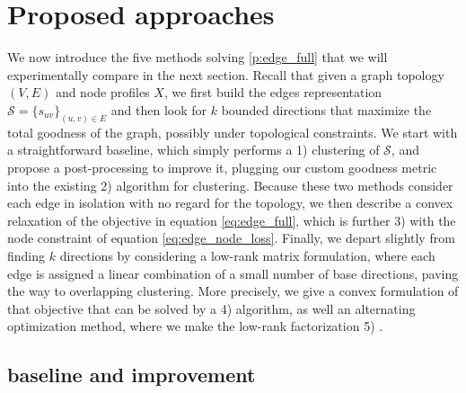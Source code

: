 

\section{Proposed approaches}
\label{sec:edge_methods}

We now introduce the five methods solving \autoref{p:edge_full} that we will experimentally compare
in the next section. Recall that given a graph topology $(V, E)$ and node profiles $X$, we first
build the edges representation $\mathcal{S} = \{s_{uv}\}_{(u,v) \in E}$ and then look for $k$
bounded directions that maximize the total goodness of the graph, possibly under topological
constraints. We start with a straightforward baseline, which simply performs a \newline
\hspace*{14pt} 1) \kmeans{} clustering of $\mathcal{S}$, \newline
and propose a post-processing to improve it, plugging our custom goodness metric into the existing
\newline \hspace*{14pt} 2) \lloyd{} algorithm for clustering. \newline
Because these two methods consider each edge in isolation with no regard for the topology, we then
describe a convex relaxation of the objective in equation \eqref{eq:edge_full}, which is further
\newline \hspace*{14pt} 3) \combined{} with the node constraint of equation
\eqref{eq:edge_node_loss}. \newline
Finally, we depart slightly from finding $k$ directions by
considering a low-rank matrix formulation, where each edge is assigned a linear combination of a
small number of base directions, paving the way to overlapping clustering. More precisely, we
give a convex formulation of that objective that can be solved by a \newline
\hspace*{14pt} 4) \fwa{} algorithm, \newline
as well an alternating optimization method, where we make the low-rank factorization \newline
\hspace*{14pt} 5) \pqt{}.

\subsection{\kmeans{} baseline and improvement}
\label{sub:edge_baseline}

